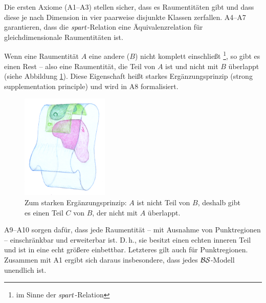 Die
ersten Axiome (A1--A3) stellen sicher, dass es Raumentitäten gibt und dass diese je nach Dimension in vier paarweise disjunkte Klassen zerfallen.
A4--A7
garantieren, dass die $\mathit{spart}$-Relation eine Äquivalenzrelation für gleichdimensionale Raumentitäten ist.


Wenn
eine Raumentität $A$ eine andere ($B$) nicht komplett einschließt%
\footnote{im Sinne der $\mathit{spart}$-Relation},
so gibt es einen Rest -- also eine Raumentität, die Teil von $A$ ist und nicht mit $B$ überlappt (siehe Abbildung \ref{fig:supplementation}).
Diese Eigenschaft heißt starkes Ergänzungsprinzip (strong supplementation principle) und wird in A8 formalisiert.

\begin{figure}[ht]
    \centering
    \includegraphics[height=5cm]{bearbeitet-22-04-25/supplementation.png}
    \caption[Zum starken Ergänzungsprinzip]{Zum starken Ergänzungsprinzip: $A$ ist nicht Teil von $B$, deshalb gibt es einen Teil $C$ von $B$, der nicht mit $A$ überlappt.}
    \label{fig:supplementation}
\end{figure}



A9--A10
sorgen dafür, dass jede Raumentität -- mit Ausnahme von Punktregionen -- einschränkbar und erweiterbar ist. D.\,h., sie besitzt einen echten inneren Teil und ist in eine echt größere einbettbar. Letzteres gilt auch für Punktregionen.
Zusammen mit A1 ergibt sich daraus insbesondere, dass jedes $\mathcal{BS}$-Modell unendlich ist.

